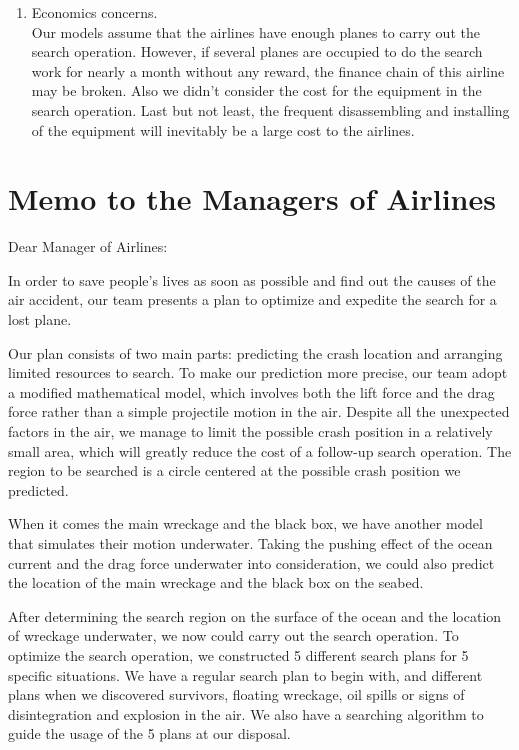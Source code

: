 \documentclass[a4paper,11pt]{article}
\begin{document}
\begin{spacing}{1.0}
\begin{enumerate}
	\item Economics concerns.
	\\Our models assume that the airlines have enough planes to carry out the search operation.  However, if several planes are occupied to do the search work for nearly a month without any reward, the finance chain of this airline may be broken. Also we didn't consider the cost for the equipment in the search operation. Last but not least, the frequent disassembling  and installing of the equipment will inevitably be a large  cost to the airlines. 
\end{enumerate}




\section{Memo to the Managers of Airlines}\label{Memo}
Dear Manager of Airlines:

In order to save people's lives as soon as possible and find out the causes of the air accident, our team presents a plan to optimize and expedite the search for a lost plane.

Our plan consists of two main parts: predicting the crash location and arranging limited resources to search. To make our prediction more precise, our team adopt a modified mathematical model, which involves both the lift force and the drag force rather than a simple projectile motion in the air. Despite all the unexpected factors in the air, we manage to limit the possible crash position in a relatively small area, which will greatly reduce the cost of a follow-up  search operation. The region to be searched is a circle centered at the possible crash position we predicted.

When it comes the main wreckage and the black box, we have another model that simulates their motion underwater. Taking the pushing effect of the ocean current and the drag force underwater into consideration, we could also predict the location of the main wreckage and the black box on the seabed.

After determining the search region on the surface of the ocean and the location of wreckage underwater, we now could carry out the search operation. To optimize the search operation, we constructed 5 different search plans for 5 specific situations. We have a regular search plan to begin with, and different plans when we discovered survivors, floating wreckage, oil spills or signs of disintegration and explosion in the air.  We also have a searching algorithm to guide the usage of the 5 plans at our disposal.


\end{spacing}
\end{document}

